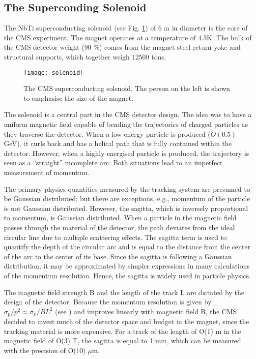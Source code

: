 \begin{normalsize}



\subsection{The Superconding Solenoid}


The NbTi superconducting solenoid (see Fig. \ref{solenoid}) of 6 m in diameter is the core of the CMS experiment. The magnet operates at a temperature of 4.5K. The bulk of the CMS detector weight (90 $\%$) comes from the magnet steel return yoke and structural supports, which together weigh 12500 tons.
 
 \begin{figure}[H]
  \centering
  \texttt{[image: solenoid]}
  \caption[The CMS superconducting solenoid]{The CMS superconducting solenoid. The person on the left is shown to emphasise the size of the magnet.}
  \label{solenoid}
\end{figure}

The solenoid is a central part in the CMS detector design. The idea was to have a uniform magnetic field capable of bending the trajectories of charged particles as they traverse the detector. When a low energy particle is produced ($O(0.5)$ GeV), it curls back and has a helical path that is fully contained within the detector. However, when a highly energised particle is produced, the trajectory is seen as a ``straight'' incomplete arc. Both situations lead to an imperfect measurement of momentum. 

The primary physics quantities measured by the tracking system are presumed to be Gaussian distributed; but there are exceptions, e.g., momentum of the particle is not Gaussian distributed. However, the sagitta, which is inversely proportional to momentum, is Gaussian distributed. When a particle in the magnetic field passes through the material of the detector, the path deviates from the ideal circular line due to multiple scattering effects. The sagitta term is used to quantify the depth of the circular arc and is equal to the distance from the center of the arc to the center of its base. Since the sagitta is following a Gaussian distribution, it may be approximated by simpler expressions in many calculations of the momentum resolution. Hence, the sagitta is widely used in particle physics. 

The magnetic field strength B and the length of the track L are dictated by the design of the detector. Because the momentum resolution is given by $\sigma_p / p^2 \approx \sigma_x / B L^2 $ (see \cite {Hauptman:2011zza}) and improves linearly with magnetic field B, the CMS decided to invest much of the detector space and budget in the magnet, since the tracking material is more expensive. For a track of the length of O(1) m in the magnetic field of O(3) T, the sagitta is equal to 1 mm, which can be measured with the precision of O(10) $\mu$m.



\end{normalsize}
